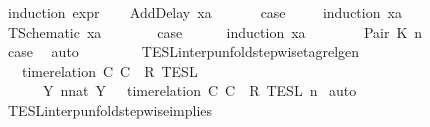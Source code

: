 \begin{isabellebody}
%
\isadelimproof
%
\endisadelimproof
%
\isatagproof
{}\isamarkupfalse%
\ {\isacharparenleft}induction\ {\isasymtau}\isactrlsub e\isactrlsub x\isactrlsub p\isactrlsub r{\isacharparenright}\isanewline
\ \ \isamarkupfalse%
\ {\isacharparenleft}AddDelay\ x{}a\ {\isasymtau}{\isacharparenright}\isanewline
\ \ \isamarkupfalse%
\ \isamarkupfalse%
\ {\isacharquery}case\ \isanewline
\ \ \isamarkupfalse%
\ {\isacharparenleft}induction\ x{}a{\isacharparenright}\isanewline
\ \ \ \ \isamarkupfalse%
\ {\isacharparenleft}TSchematic\ xa{\isacharparenright}\isanewline
\ \ \ \ \isamarkupfalse%
\ \isamarkupfalse%
\ {\isacharquery}case\isanewline
\ \ \ \ \isamarkupfalse%
\ {\isacharparenleft}induction\ xa{\isacharparenright}\isanewline
\ \ \ \ \ \ \isamarkupfalse%
\ {\isacharparenleft}Pair\ K\ n{\isacharprime}{\isacharparenright}\isanewline
\ \ \ \ \ \ \isamarkupfalse%
\ \isamarkupfalse%
\ {\isacharquery}case\ \isamarkupfalse%
\ auto\isanewline
\ \ \ \ \isamarkupfalse%
\isanewline
\ \ \isamarkupfalse%
\isanewline
{}\isamarkupfalse%
%
\endisatagproof
{\isafoldproof}%
%
\isadelimproof
\isanewline
%
\endisadelimproof
\isanewline
{}\isamarkupfalse%
\ TESL{\isacharunderscore}interp{\isacharunderscore}unfold{\isacharunderscore}stepwise{\isacharunderscore}tagrelgen{\isacharcolon}\isanewline
\ \ {\isacartoucheopen}{\isasymlbrakk}\ time{\isacharminus}relation\ {\isasymlfloor}C\ C\ {\isasymin}\ R\ {\isasymrbrakk}\isactrlsub T\isactrlsub E\isactrlsub S\isactrlsub L\isanewline
\ \ \ \ {\isacharequal}\ {\isasymInter}\ {\isacharbraceleft}Y{\isachardot}\ {\isasymexists}n{\isacharcolon}{\isacharcolon}nat{\isachardot}\ Y\ {\isacharequal}\ {\isasymlbrakk}\ time{\isacharminus}relation\ {\isasymlfloor}C\ C\ {\isasymin}\ R\ {\isasymrbrakk}\isactrlsub T\isactrlsub E\isactrlsub S\isactrlsub L\isactrlbsup {\isasymge}\ n\isactrlesup {\isacharbraceright}{\isacartoucheclose}\isanewline
%
\isadelimproof
%
\endisadelimproof
%
\isatagproof
{}\isamarkupfalse%
\ auto%
\endisatagproof
{\isafoldproof}%
%
\isadelimproof
\isanewline
%
\endisadelimproof
\isanewline
{}\isamarkupfalse%
\ TESL{\isacharunderscore}interp{\isacharunderscore}unfold{\isacharunderscore}stepwise{\isacharunderscore}implies{\isacharcolon}\isanewline

\end{isabellebody}
